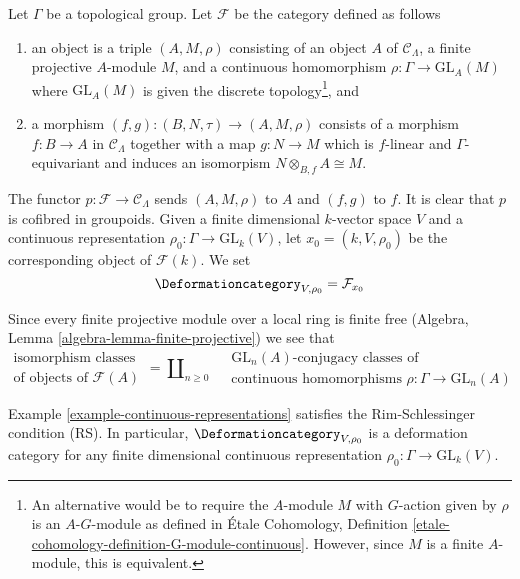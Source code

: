 \begin{example}
\label{example-continuous-representations}
Let $\Gamma$ be a topological group.
Let $\mathcal{F}$ be the category defined as follows
\begin{enumerate}
\item an object is a triple $(A, M, \rho)$ consisting of an
object $A$ of $\mathcal{C}_\Lambda$, a finite projective $A$-module $M$,
and a continuous homomorphism $\rho : \Gamma \to \text{GL}_A(M)$
where $\text{GL}_A(M)$ is given the discrete topology\footnote{An alternative
would be to require the $A$-module $M$ with $G$-action given by $\rho$
is an $A\text{-}G$-module as defined in \'Etale Cohomology, Definition
\ref{etale-cohomology-definition-G-module-continuous}. However,
since $M$ is a finite $A$-module, this is equivalent.}, and
\item a morphism $(f, g) : (B, N, \tau) \to (A, M, \rho)$ consists of
a morphism $f : B \to A$ in $\mathcal{C}_\Lambda$ together
with a map $g : N \to M$ which is $f$-linear and $\Gamma$-equivariant
and induces an isomorpism $N \otimes_{B, f} A \cong M$.
\end{enumerate}
The functor $p : \mathcal{F} \to \mathcal{C}_\Lambda$ sends $(A, M, \rho)$
to $A$ and $(f, g)$ to $f$. It is clear that $p$ is cofibred in groupoids.
Given a finite dimensional $k$-vector space $V$ and a
continuous representation $\rho_0 : \Gamma \to \text{GL}_k(V)$,
let $x_0 = (k, V, \rho_0)$ be the corresponding object of $\mathcal{F}(k)$.
We set
$$
\Deformationcategory_{V, \rho_0} = \mathcal{F}_{x_0}
$$
\end{example}

\noindent
Since every finite projective module over a local ring is finite free
(Algebra, Lemma \ref{algebra-lemma-finite-projective})
we see that
$$
\begin{matrix}
\text{isomorphism classes} \\
\text{of objects of }\mathcal{F}(A)
\end{matrix}
=
\coprod\nolimits_{n \geq 0}\quad
\begin{matrix}
\text{GL}_n(A)\text{-conjugacy classes of}\\
\text{continuous homomorphisms }\rho : \Gamma \to \text{GL}_n(A)
\end{matrix}
$$

\begin{lemma}
\label{lemma-continuous-representations-RS}
Example \ref{example-continuous-representations}
satisfies the Rim-Schlessinger condition (RS).
In particular, $\Deformationcategory_{V, \rho_0}$ is a deformation category
for any finite dimensional continuous representation
$\rho_0 : \Gamma \to \text{GL}_k(V)$.
\end{lemma}

